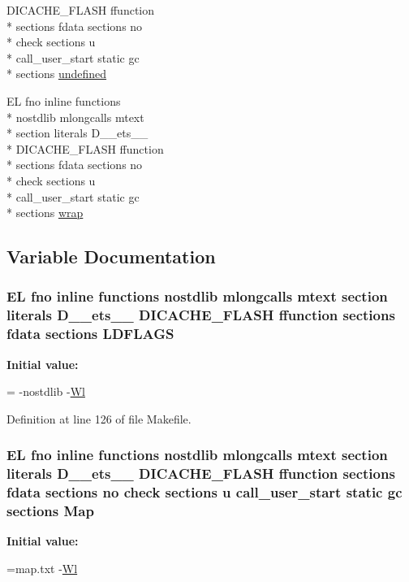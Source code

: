 \begin{DoxyCompactItemize}
D\-I\-C\-A\-C\-H\-E\-\_\-\-F\-L\-A\-S\-H ffunction \\*
sections fdata sections no \\*
check sections u \\*
call\-\_\-user\-\_\-start static gc \\*
sections \hyperlink{Makefile_a7caa220288c6621dffebfc3a50a851e1}{undefined}
\item 
E\-L fno inline functions \\*
nostdlib mlongcalls mtext \\*
section literals D\-\_\-\-\_\-ets\-\_\-\-\_\- \\*
D\-I\-C\-A\-C\-H\-E\-\_\-\-F\-L\-A\-S\-H ffunction \\*
sections fdata sections no \\*
check sections u \\*
call\-\_\-user\-\_\-start static gc \\*
sections \hyperlink{Makefile_a6b04d3dc9ff8a69521845b59ef6c33f1}{wrap}
\end{DoxyCompactItemize}


\subsection{Variable Documentation}
\hypertarget{Makefile_a0b0ec95cdd594ae63274ea3aa92e8bac}{
\subsubsection[{L\-D\-F\-L\-A\-G\-S}]{\setlength{\rightskip}{0pt plus 5cm}E\-L fno inline functions nostdlib mlongcalls mtext section literals D\-\_\-\-\_\-ets\-\_\-\-\_\- D\-I\-C\-A\-C\-H\-E\-\_\-\-F\-L\-A\-S\-H ffunction sections fdata sections L\-D\-F\-L\-A\-G\-S}}\label{Makefile_a0b0ec95cdd594ae63274ea3aa92e8bac}
{\bfseries Initial value\-:}
\begin{DoxyCode}
= -nostdlib 
    -\hyperlink{Makefile_a1af3a6ecef406b93f1a1db145b2cfd43}{Wl}
\end{DoxyCode}


Definition at line 126 of file Makefile.

\hypertarget{Makefile_a3d2682475b097eef42d87fa20f765794}{
\subsubsection[{Map}]{\setlength{\rightskip}{0pt plus 5cm}E\-L fno inline functions nostdlib mlongcalls mtext section literals D\-\_\-\-\_\-ets\-\_\-\-\_\- D\-I\-C\-A\-C\-H\-E\-\_\-\-F\-L\-A\-S\-H ffunction sections fdata sections no check sections u call\-\_\-user\-\_\-start static gc sections Map\hspace{0.3cm}{\ttfamily [static]}}}\label{Makefile_a3d2682475b097eef42d87fa20f765794}
{\bfseries Initial value\-:}
\begin{DoxyCode}
=map.txt  
    -\hyperlink{Makefile_a1af3a6ecef406b93f1a1db145b2cfd43}{Wl}
\end{DoxyCode}


